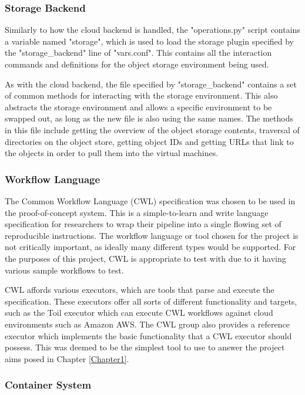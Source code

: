 \subsubsection{Storage Backend}

Similarly to how the cloud backend is handled, the "operations.py" script contains a variable named "storage", which is used to load the storage plugin specified by the "storage\_backend" line of "vars.conf". This contains all the interaction commands and definitions for the object storage environment being used.

As with the cloud backend, the file specified by "storage\_backend" contains a set of common methods for interacting with the storage environment. This also abstracts the storage environment and allows a specific environment to be swapped out, as long as the new file is also using the same names. The methods in this file include getting the overview of the object storage contents, traversal of directories on the object store, getting object IDs and getting URLs that link to the objects in order to pull them into the virtual machines.

\subsubsection{Workflow Language}

The Common Workflow Language (CWL) specification was chosen to be used in the proof-of-concept system. This is a simple-to-learn and write language specification for researchers to wrap their pipeline into a single flowing set of reproducible instructions. The workflow language or tool chosen for the project is not critically important, as ideally many different types would be supported. For the purposes of this project, CWL is appropriate to test with due to it having various sample workflows to test.

CWL affords various executors, which are tools that parse and execute the specification. These executors offer all sorts of different functionality and targets, such as the Toil executor which can execute CWL workflows against cloud environments such as Amazon AWS. The CWL group also provides a reference executor which implements the basic functionality that a CWL executor should possess. This was deemed to be the simplest tool to use to answer the project aims posed in Chapter \ref{Chapter1}.

\subsubsection{Container System}

